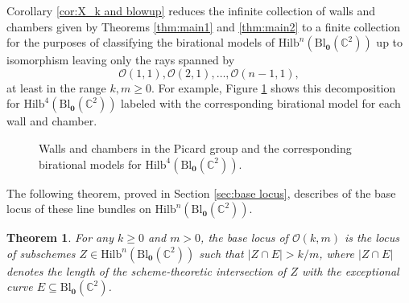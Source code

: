 \documentclass[12pt]{amsart}
\newcommand{\Hilb}{\mathrm{Hilb}}
\newcommand{\C}{\mathbb{C}}
\newcommand{\CO}{\mathcal{O}}
\newcommand{\Sym}{\mathrm{Sym}}
\newcommand{\Bl}{\mathrm{Bl}}
\numberwithin{equation}{section}
\newtheorem{theorem}{Theorem}[section]
\theoremstyle{definition}
\begin{document}
Corollary \ref{cor:X_k and blowup}  reduces the infinite collection of walls and chambers given by Theorems \ref{thm:main1} and \ref{thm:main2} to a finite collection for the purposes of classifying the birational models of $\Hilb^n(\Bl_{\mathbf{0}}(\C^2))$ up to isomorphism leaving only the rays spanned by $$\CO(1,1),\CO(2,1),\dots,\CO(n-1,1),$$ at least in the range $k,m\geq 0$. For example, Figure \ref{fig:Chambers for n=4} shows this decomposition for $\Hilb^4(\Bl_{\mathbf{0}}(\C^2))$ labeled with the corresponding birational model for each wall and chamber.

\begin{figure}[h]
    \centering
    \caption{Walls and chambers in the Picard group and the corresponding birational models for $\Hilb^4(\Bl_{\mathbf{0}}(\C^2))$.}
    \label{fig:Chambers for n=4}
\end{figure}
 

The following theorem, proved in Section \ref{sec:base locus}, describes of the base locus of these line bundles on $\Hilb^n(\Bl_\mathbf{0}(\C^2))$.

\begin{theorem}\label{thm:base locus decomp}
    For any $k\geq 0$ and $m>0$, the base locus of $\CO(k,m)$ is the locus of subschemes $Z\in \Hilb^n(\Bl_\mathbf{0}(\C^2))$ such that $|Z\cap E|>k/m$, where $|Z\cap E|$ denotes the length of the scheme-theoretic intersection of $Z$ with the exceptional curve $E\subseteq \Bl_{\mathbf{0}}(\C^2)$.
\end{theorem}
\end{document}
